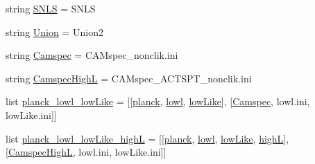 \begin{DoxyCompactItemize}
\item 
string \mbox{\hyperlink{namespaceplanck_1_1settings__planck__nominal_a3f2634d940ded428a6f31ee88bc9f86b}{S\+N\+LS}} = \textquotesingle{}S\+N\+LS\textquotesingle{}
\item 
string \mbox{\hyperlink{namespaceplanck_1_1settings__planck__nominal_a881d9a8c1c79af83da31227898c4cba7}{Union}} = \textquotesingle{}Union2\textquotesingle{}
\item 
string \mbox{\hyperlink{namespaceplanck_1_1settings__planck__nominal_abe836cf536af620f0c0b86090b4155b9}{Camspec}} = \textquotesingle{}C\+A\+Mspec\+\_\+nonclik.\+ini\textquotesingle{}
\item 
string \mbox{\hyperlink{namespaceplanck_1_1settings__planck__nominal_aa2ae616c3b4aa7481497a1ee554915b8}{Camspec\+HighL}} = \textquotesingle{}C\+A\+Mspec\+\_\+\+A\+C\+T\+S\+P\+T\+\_\+nonclik.\+ini\textquotesingle{}
\item 
list \mbox{\hyperlink{namespaceplanck_1_1settings__planck__nominal_a4bf45189d73a86270c7923b7b03cfa28}{planck\+\_\+lowl\+\_\+low\+Like}} = \mbox{[}\mbox{[}\mbox{\hyperlink{namespaceplanck_1_1settings__planck__nominal_a6f1ef8e232b47d87b6d83ec17c539b60}{planck}}, \mbox{\hyperlink{namespaceplanck_1_1settings__planck__nominal_ad04222a8b97633aad278ce11ad27993e}{lowl}}, \mbox{\hyperlink{namespaceplanck_1_1settings__planck__nominal_a68ceaa201b9747d89c2fc510f421f4e8}{low\+Like}}\mbox{]}, \mbox{[}\mbox{\hyperlink{namespaceplanck_1_1settings__planck__nominal_abe836cf536af620f0c0b86090b4155b9}{Camspec}}, \textquotesingle{}lowl.\+ini\textquotesingle{}, \textquotesingle{}low\+Like.\+ini\textquotesingle{}\mbox{]}\mbox{]}
\item 
list \mbox{\hyperlink{namespaceplanck_1_1settings__planck__nominal_a32a8325ab57cefb025347569c74c20bd}{planck\+\_\+lowl\+\_\+low\+Like\+\_\+highL}} = \mbox{[}\mbox{[}\mbox{\hyperlink{namespaceplanck_1_1settings__planck__nominal_a6f1ef8e232b47d87b6d83ec17c539b60}{planck}}, \mbox{\hyperlink{namespaceplanck_1_1settings__planck__nominal_ad04222a8b97633aad278ce11ad27993e}{lowl}}, \mbox{\hyperlink{namespaceplanck_1_1settings__planck__nominal_a68ceaa201b9747d89c2fc510f421f4e8}{low\+Like}}, \mbox{\hyperlink{namespaceplanck_1_1settings__planck__nominal_a2149979f1abc79475e000b828812fafb}{highL}}\mbox{]}, \mbox{[}\mbox{\hyperlink{namespaceplanck_1_1settings__planck__nominal_aa2ae616c3b4aa7481497a1ee554915b8}{Camspec\+HighL}}, \textquotesingle{}lowl.\+ini\textquotesingle{}, \textquotesingle{}low\+Like.\+ini\textquotesingle{}\mbox{]}\mbox{]}
\item 

\end{DoxyCompactItemize}
